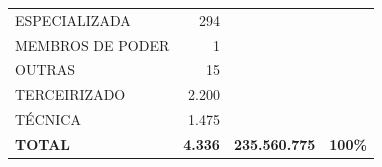 \documentclass{article}
\begin{document}
\begin{longtable}[c]{m{7cm}|m{2.5cm}|m{2.5cm}|m{2.5cm}}
\multicolumn{1}{L{7cm}|}{ \hspace{3em} ESPECIALIZADA} & \multicolumn{1}{r|}{   294} &  & \\
\multicolumn{1}{L{7cm}|}{ \hspace{3em} MEMBROS DE PODER} & \multicolumn{1}{r|}{     1} &  & \\
\multicolumn{1}{L{7cm}|}{ \hspace{3em} OUTRAS} & \multicolumn{1}{r|}{    15} &  & \\
\multicolumn{1}{L{7cm}|}{ \hspace{3em} TERCEIRIZADO} & \multicolumn{1}{r|}{ 2.200} &  & \\
\multicolumn{1}{L{7cm}|}{ \hspace{3em} TÉCNICA} & \multicolumn{1}{r|}{ 1.475} &  & \\
\hline \hline 
\multicolumn{1}{L{7cm}|}{ \textbf{TOTAL}} & \multicolumn{1}{r|}{ \textbf{4.336}} & \multicolumn{1}{r|}{ \textbf{235.560.775}} & \multicolumn{1}{r}{ \textbf{100\%}} \\
\end{longtable}
\newpage
\small
\end{document}
